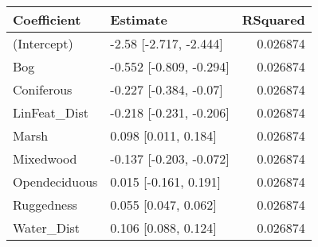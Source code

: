 \documentclass[]{article}
\begin{document}
\begin{tabular}{llr}
\toprule
Coefficient & Estimate & RSquared\\
\midrule
(Intercept) & -2.58 [-2.717, -2.444] & 0.026874\\
Bog & -0.552 [-0.809, -0.294] & 0.026874\\
Coniferous & -0.227 [-0.384, -0.07] & 0.026874\\
LinFeat\_Dist & -0.218 [-0.231, -0.206] & 0.026874\\
Marsh & 0.098 [0.011, 0.184] & 0.026874\\
Mixedwood & -0.137 [-0.203, -0.072] & 0.026874\\
Opendeciduous & 0.015 [-0.161, 0.191] & 0.026874\\
Ruggedness & 0.055 [0.047, 0.062] & 0.026874\\
Water\_Dist & 0.106 [0.088, 0.124] & 0.026874\\
\bottomrule
\end{tabular}
\end{document}
